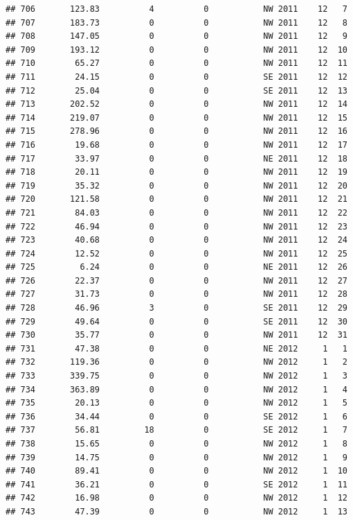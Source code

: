 \documentclass[
]{article}
\begin{document}
\begin{verbatim}
## 706       123.83          4          0           NW 2011    12   7
## 707       183.73          0          0           NW 2011    12   8
## 708       147.05          0          0           NW 2011    12   9
## 709       193.12          0          0           NW 2011    12  10
## 710        65.27          0          0           NW 2011    12  11
## 711        24.15          0          0           SE 2011    12  12
## 712        25.04          0          0           SE 2011    12  13
## 713       202.52          0          0           NW 2011    12  14
## 714       219.07          0          0           NW 2011    12  15
## 715       278.96          0          0           NW 2011    12  16
## 716        19.68          0          0           NW 2011    12  17
## 717        33.97          0          0           NE 2011    12  18
## 718        20.11          0          0           NW 2011    12  19
## 719        35.32          0          0           NW 2011    12  20
## 720       121.58          0          0           NW 2011    12  21
## 721        84.03          0          0           NW 2011    12  22
## 722        46.94          0          0           NW 2011    12  23
## 723        40.68          0          0           NW 2011    12  24
## 724        12.52          0          0           NW 2011    12  25
## 725         6.24          0          0           NE 2011    12  26
## 726        22.37          0          0           NW 2011    12  27
## 727        31.73          0          0           NW 2011    12  28
## 728        46.96          3          0           SE 2011    12  29
## 729        49.64          0          0           SE 2011    12  30
## 730        35.77          0          0           NW 2011    12  31
## 731        47.38          0          0           NE 2012     1   1
## 732       119.36          0          0           NW 2012     1   2
## 733       339.75          0          0           NW 2012     1   3
## 734       363.89          0          0           NW 2012     1   4
## 735        20.13          0          0           NW 2012     1   5
## 736        34.44          0          0           SE 2012     1   6
## 737        56.81         18          0           SE 2012     1   7
## 738        15.65          0          0           NW 2012     1   8
## 739        14.75          0          0           NW 2012     1   9
## 740        89.41          0          0           NW 2012     1  10
## 741        36.21          0          0           SE 2012     1  11
## 742        16.98          0          0           NW 2012     1  12
## 743        47.39          0          0           NW 2012     1  13

\end{verbatim}
\end{document}

